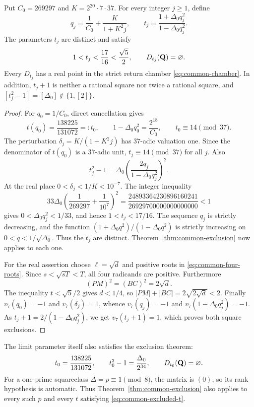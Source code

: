 \begin{corollary}\label{cor:common-infinite}
Put $C_0=269297$ and $K=2^{20}\cdot7\cdot37$.  For every integer
$j\ge1$, define
\begin{equation}\label{eq:common-infinite}
 q_j=\frac1{C_0}+\frac K{1+K^2j},\qquad
 t_j=\frac{1+\Delta_0q_j^2}{1-\Delta_0q_j^2}.
\end{equation}
The parameters $t_j$ are distinct and satisfy
\[
 1<t_j<\frac{17}{16}<\frac{\sqrt5}{2},\qquad
 D_{t_j}(\mathbf Q)=\varnothing.
\]
Every $D_{t_j}$ has a real point in the strict return chamber
\eqref{eq:common-chamber}.  In addition, $t_j+1$ is neither a rational
square nor twice a rational square, and
$[t_j^2-1]=[\Delta_0]\notin\{1,[2]\}$.
\end{corollary}
\begin{proof}
For $q_0=1/C_0$, direct cancellation gives
\[
 t(q_0)=\frac{138225}{131072}=:t_0,\qquad
 1-\Delta_0q_0^2=\frac{2^{18}}{C_0},\qquad
 t_0\equiv14\pmod{37}.
\]
The perturbation $\delta_j=K/(1+K^2j)$ has $37$-adic valuation one.
Since the denominator of $t(q_0)$ is a $37$-adic unit,
$t_j\equiv14\pmod{37}$ for all $j$.  Also
\[
 t_j^2-1=\Delta_0
 \left(\frac{2q_j}{1-\Delta_0q_j^2}\right)^2.
\]
At the real place $0<\delta_j<1/K<10^{-7}$.  The integer inequality
\[
 33\Delta_0\left(\frac1{269297}+\frac1{10^7}\right)^2
 =\frac{24893364230896160241}{26929700000000000000}<1
\]
gives $0<\Delta_0q_j^2<1/33$, and hence $1<t_j<17/16$.
The sequence $q_j$ is strictly decreasing, and the function
$(1+\Delta_0q^2)/(1-\Delta_0q^2)$ is strictly increasing on
$0<q<1/\sqrt{\Delta_0}$.  Thus the $t_j$ are distinct.
Theorem~\ref{thm:common-exclusion} now applies to each one.

For the real assertion choose $\ell=\sqrt d$ and positive roots in
\eqref{eq:common-four-roots}.  Since $s<\sqrt{sT}<T$, all four
radicands are positive.  Furthermore
\[
 (PM)^2=(BC)^2=2\sqrt d.
\]
The inequality $t<\sqrt5/2$ gives $d<1/4$, so
$|PM|+|BC|=2\sqrt{2\sqrt d}<2$.
Finally $v_7(q_0)=-1$ and $v_7(\delta_j)=1$, whence
$v_7(q_j)=-1$ and $v_7(1-\Delta_0q_j^2)=-1$.
As $t_j+1=2/(1-\Delta_0q_j^2)$, we get $v_7(t_j+1)=1$,
which proves both square exclusions.
\end{proof}

The limit parameter itself also satisfies the exclusion theorem:
\begin{equation}\label{eq:common-t0}
 t_0=\frac{138225}{131072},\qquad
 t_0^2-1=\frac{\Delta_0}{2^{34}},\qquad D_{t_0}(\mathbf Q)=\varnothing.
\end{equation}
For a one-prime squareclass $\Delta=p\equiv1\pmod8$, the matrix is
$(0)$, so its rank hypothesis is automatic.  Thus
Theorem~\ref{thm:common-exclusion} also applies to every such $p$ and
every $t$ satisfying \eqref{eq:common-excluded-t}.

